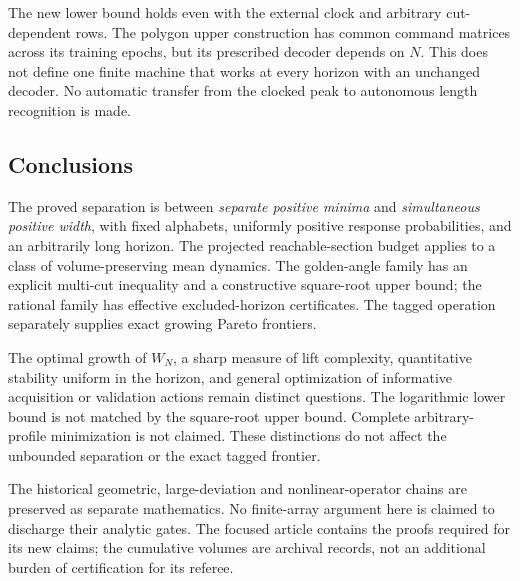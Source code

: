 The new lower bound holds even with the external clock and arbitrary
cut-dependent rows. The polygon upper construction has common command
matrices across its training epochs, but its prescribed decoder depends
on $N$. This does not define one finite machine that works at every
horizon with an unchanged decoder. No automatic transfer from the
clocked peak to autonomous length recognition is made.

\subsection{Conclusions}
The proved separation is between \emph{separate positive minima} and
\emph{simultaneous positive width}, with fixed alphabets, uniformly
positive response probabilities, and an arbitrarily long horizon.
The projected reachable-section budget applies to a class of
volume-preserving mean dynamics. The golden-angle family has an
explicit multi-cut inequality and a constructive square-root upper
bound; the rational family has effective excluded-horizon certificates.
The tagged operation separately supplies exact growing Pareto frontiers.

The optimal growth of $W_N$, a sharp measure of lift complexity,
quantitative stability uniform in the horizon, and general optimization
of informative acquisition or validation actions remain distinct
questions. The logarithmic lower bound is not matched by the
square-root upper bound. Complete arbitrary-profile minimization is not
claimed. These distinctions do not affect the unbounded separation or
the exact tagged frontier.

The historical geometric, large-deviation and nonlinear-operator chains
are preserved as separate mathematics. No finite-array argument here is
claimed to discharge their analytic gates. The focused article contains
the proofs required for its new claims; the cumulative volumes are
archival records, not an additional burden of certification for its
referee.
